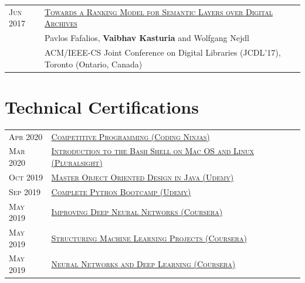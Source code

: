 \documentclass[a4paper,10pt]{article} %
\begin{document}
\begin{tabular}{ll}
\textsc{Jun 2017} & \href{http://ieeexplore.ieee.org/document/7991617/}{\textsc{Towards a Ranking Model for Semantic Layers over 
Digital Archives}}\\
& Pavlos Fafalios, \textbf{Vaibhav Kasturia} and Wolfgang Nejdl\\
& ACM/IEEE-CS Joint Conference on Digital Libraries (JCDL’17), Toronto (Ontario, Canada)\\
\end{tabular}


\section{Technical Certifications}

\begin{tabular}{ll}
\textsc{Apr 2020} & \href{https://ninjasfiles.s3.amazonaws.com/certificate643308086b235198c8d9aa73fa674fe417597e.pdf}{\textsc{Competitive Programming (Coding Ninjas)}}\\
\textsc{Mar 2020} & \href{https://vaibhavkasturia.com/certificate/introduction-to-the-bash-shell-on-macos-and-linux-vaibhav-kasturia.pdf}{\textsc{Introduction to the Bash Shell on Mac OS and Linux (Pluralsight)}}\\
\textsc{Oct 2019} & \href{https://www.udemy.com/certificate/UC-1EV6KK7F/}{\textsc{Master Object Oriented Design in Java (Udemy)}}\\
\textsc{Sep 2019} & \href{https://www.udemy.com/certificate/UC-P7AJYXY6/}{\textsc{Complete Python Bootcamp (Udemy)}}\\
\textsc{May 2019} & \href{https://www.coursera.org/account/accomplishments/verify/XN25BG7WGAM3}{\textsc{Improving Deep Neural Networks (Coursera)}}\\
\textsc{May 2019} & \href{https://www.coursera.org/account/accomplishments/certificate/LWCFY27WJB9R}{\textsc{Structuring Machine Learning Projects (Coursera)}}\\
\textsc{May 2019} & \href{https://www.coursera.org/account/accomplishments/verify/KCVQACF5SKEM}{\textsc{Neural Networks and Deep Learning (Coursera)}}\\
\end{tabular}
\end{document}
